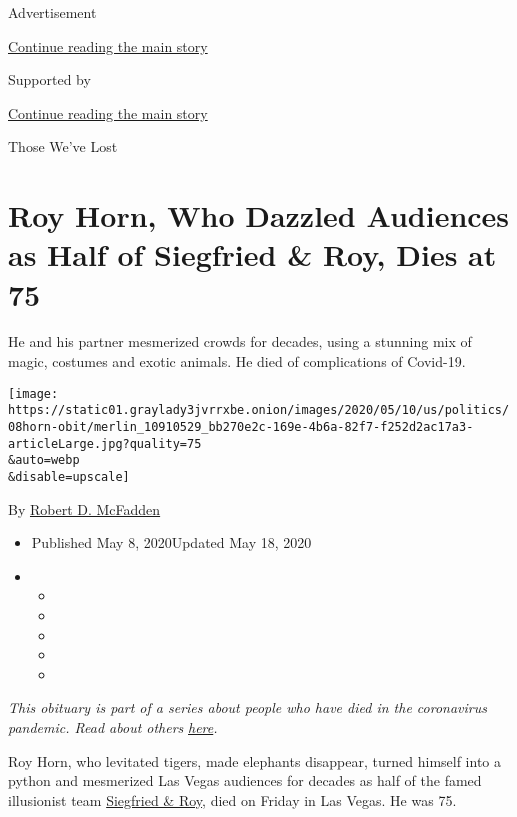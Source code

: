 Advertisement

\protect\hyperlink{after-top}{Continue reading the main story}

Supported by

\protect\hyperlink{after-sponsor}{Continue reading the main story}

Those We've Lost

\hypertarget{roy-horn-who-dazzled-audiences-as-half-of-siegfried--roy-dies-at-75}{%
\section{Roy Horn, Who Dazzled Audiences as Half of Siegfried \& Roy,
Dies at
75}\label{roy-horn-who-dazzled-audiences-as-half-of-siegfried--roy-dies-at-75}}

He and his partner mesmerized crowds for decades, using a stunning mix
of magic, costumes and exotic animals. He died of complications of
Covid-19.

\texttt{[image: https://static01.graylady3jvrrxbe.onion/images/2020/05/10/us/politics/08horn-obit/merlin\_10910529\_bb270e2c-169e-4b6a-82f7-f252d2ac17a3-articleLarge.jpg?quality=75\\\&auto=webp\\\&disable=upscale]}

By \href{https://www.nytimes3xbfgragh.onion/by/robert-d-mcfadden}{Robert
D. McFadden}

\begin{itemize}
\item
  Published May 8, 2020Updated May 18, 2020
\item
  \begin{itemize}
  \item
  \item
  \item
  \item
  \item
  \end{itemize}
\end{itemize}

\emph{This obituary is part of a series about people who have died in
the coronavirus pandemic. Read about others}
\href{https://www.nytimes3xbfgragh.onion/series/people-who-have-died-of-the-coronavirus}{\emph{here}}\emph{.}

Roy Horn, who levitated tigers, made elephants disappear, turned himself
into a python and mesmerized Las Vegas audiences for decades as half of
the famed illusionist team \href{http://siegfriedandroy.com/}{Siegfried
\& Roy}, died on Friday in Las Vegas. He was 75.

